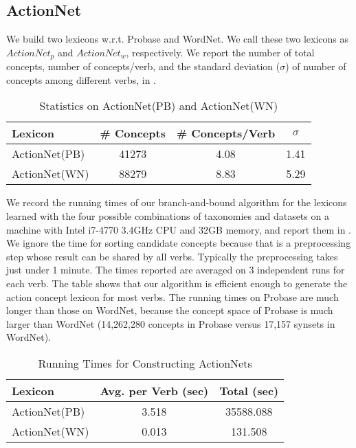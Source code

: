 \subsection{ActionNet}
\label{sec:efficiency}
We build two lexicons w.r.t. Probase and WordNet. We call
these two lexicons as $ActionNet_p$ and $ActionNet_w$, respectively.
We report the number of total concepts, number of concepts/verb,
and the standard deviation ($\sigma$) of number of concepts among different verbs,
in .

\begin{table}[th]
\centering
\scriptsize
\caption{Statistics on ActionNet(PB) and ActionNet(WN)}
\begin{tabular}{|l|c|c|c|} \hline
Lexicon & \# Concepts & \# Concepts/Verb & $\sigma$ \\ \hline \hline
ActionNet(PB)& 41273  & 4.08 & 1.41 \\ \hline
ActionNet(WN)&  88279 & 8.83 & 5.29\\ \hline
\end{tabular}
\label{tab:anstat}
\end{table}

We record the running times of our branch-and-bound algorithm
for the lexicons learned with the
four possible combinations of taxonomies and datasets
on a machine with Intel i7-4770 3.4GHz
CPU and 32GB memory, and report them in .
We ignore the time for sorting candidate concepts because that
is a preprocessing step whose result can be shared by all verbs.
Typically the preprocessing takes just under 1 minute.
The times reported are averaged on 3 independent runs for each verb.
The table shows that our algorithm is
efficient enough to generate the action concept lexicon for most verbs.
The running times on Probase are much longer than those on WordNet,
because the concept space of Probase is much larger than WordNet
(14,262,280 concepts in Probase versus 17,157 synsets in WordNet).
\begin{table}[th]
\centering
\scriptsize
\caption{Running Times for Constructing ActionNets}
\begin{tabular}{|l|c|c|} \hline
Lexicon & Avg. per Verb (sec) & Total (sec) \\ \hline \hline
ActionNet(PB) & 3.518 &	35588.088\\ \hline
ActionNet(WN) &	0.013	& 131.508	\\ \hline
\end{tabular}
\label{tab:time}
\end{table}
\vspace{-2mm}

